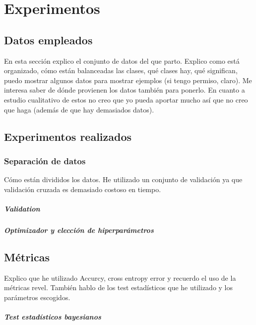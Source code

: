 \clearpage


\newpage
\chapter{Experimentos} \label{cap:exp}


\section{Datos empleados} \label{sec:datos}
En esta sección explico el conjunto de datos del que parto. Explico como está organizado, cómo están balanceadas las clases, qué clases hay, qué significan, puedo mostrar algunos datos para mostrar ejemplos (si tengo permiso, claro). Me interesa saber de dónde provienen los datos también para ponerlo. En cuanto a estudio cualitativo de estos no creo que yo pueda aportar mucho así que no creo que haga (además de que hay demasiados datos).
\section{Experimentos realizados}

\subsection{Separación de datos}

Cómo están divididos los datos. He utilizado un conjunto de validación ya que validación cruzada es demasiado costoso en tiempo.

\paragraph*{Validation}

\paragraph*{Optimizador y elección de hiperparámetros}



\section{Métricas}
Explico que he utilizado Accurcy, cross entropy error y recuerdo el uso de la métricas revel. También hablo de los test estadísticos que he utilizado y los parámetros escogidos.
\paragraph*{Test estadísticos bayesianos}


